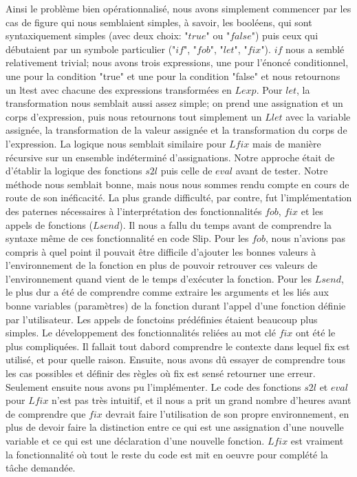 \documentclass{article}
\begin{document}
	Ainsi le problème bien opérationnalisé, nous avons simplement commencer par les
	cas de figure qui nous semblaient simples, à savoir, les booléens, qui sont
	syntaxiquement simples (avec deux choix: "$true$" ou "$false$") puis ceux qui débutaient
	par un symbole particulier ("$if$", "$fob$", "$let$", "$fix$"). $if$ nous a semblé
	relativement trivial; nous avons trois expressions, une pour l'énoncé conditionnel,
	une pour la condition "true" et une pour la condition "false" et nous
	retournons un ltest avec chacune des expressions transformées en $Lexp$. Pour $l
	et$, la transformation nous semblait aussi assez simple; on prend une assignation
	et un corps d'expression, puis nous retournons tout simplement un $Llet$ avec
	la variable assignée, la transformation de la valeur assignée et la transformation
	du corps de l'expression. La logique nous semblait similaire pour $Lfix$ mais
	de manière récursive sur un ensemble indéterminé d'assignations. Notre approche
	était de d'établir la logique des fonctions $s2l$ puis celle de $eval$ avant de
	tester. Notre méthode nous semblait bonne, mais nous nous sommes rendu compte en
	cours de route de son inéficacité. La plus grande difficulté, par contre, fut
	l'implémentation des paternes nécessaires à l'interprétation des
	fonctionnalités $fob$, $fix$ et les appels de fonctions ($Lsend$). Il nous a
	fallu du temps avant de comprendre la syntaxe même de ces fonctionnalité en
	code Slip. Pour les $fob$, nous n'avions pas compris à quel point il pouvait
	être difficile d'ajouter les bonnes valeurs à l'environnement de la fonction
	en plus de pouvoir retrouver ces valeurs de l'environnement quand vient de le
	temps d'exécuter la fonction. Pour les $Lsend$, le plus dur a été de
	comprendre comme extraire les arguments et les liés aux bonne variables (paramètres)
	de la fonction durant l'appel d'une fonction définie par l'utilisateur. Les appels
	de fonctoins prédéfinies étaient beaucoup plus simples. Le développement des
	fonctionnalités reliées au mot clé $fix$ ont été le plus compliquées. Il fallait
	tout dabord comprendre le contexte dans lequel fix est utilisé, et pour quelle
	raison. Ensuite, nous avons dû essayer de comprendre tous les cas possibles et
	définir des règles où fix est sensé retourner une erreur. Seulement ensuite nous
	avons pu l'implémenter. Le code des fonctions $s2l$ et $eval$ pour $Lfix$ n'est
	pas très intuitif, et il nous a prit un grand nombre d'heures avant de comprendre
	que $fix$ devrait faire l'utilisation de son propre environnement, en plus de
	devoir faire la distinction entre ce qui est une assignation d'une nouvelle
	variable et ce qui est une déclaration d'une nouvelle fonction. $Lfix$ est vraiment
	la fonctionnalité où tout le reste du code est mit en oeuvre pour complété la tâche
	demandée.
\end{document}
